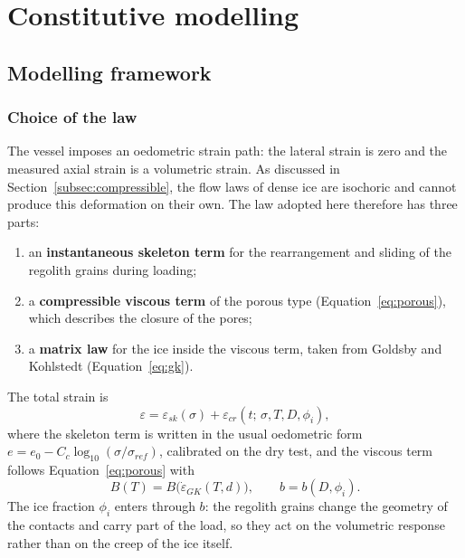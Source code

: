 \chapter{Constitutive modelling}
\label{ch:modelling}%

\section{Modelling framework}
\label{sec:framework}

\subsection{Choice of the law}

The vessel imposes an oedometric strain path: the lateral strain is zero and the measured axial strain is a volumetric strain. As discussed in Section~\ref{subsec:compressible}, the flow laws of dense ice are isochoric and cannot produce this deformation on their own. The law adopted here therefore has three parts:
\begin{enumerate}
    \item an \textbf{instantaneous skeleton term} for the rearrangement and sliding of the regolith grains during loading;
    \item a \textbf{compressible viscous term} of the porous type (Equation~\eqref{eq:porous}), which describes the closure of the pores;
    \item a \textbf{matrix law} for the ice inside the viscous term, taken from Goldsby and Kohlstedt (Equation~\eqref{eq:gk}).
\end{enumerate}
The total strain is
\begin{equation}
    \varepsilon = \varepsilon_{sk}(\sigma) + \varepsilon_{cr}(t;\,\sigma, T, D, \phi_i),
    \label{eq:decomposition}
\end{equation}
where the skeleton term is written in the usual oedometric form $e = e_0 - C_c\log_{10}(\sigma/\sigma_{ref})$, calibrated on the dry test, and the viscous term follows Equation~\eqref{eq:porous} with
\begin{equation}
    B(T) = B\bigl(\dot\varepsilon_{GK}(T, d)\bigr), \qquad b = b(D, \phi_i).
\end{equation}
The ice fraction $\phi_i$ enters through $b$: the regolith grains change the geometry of the contacts and carry part of the load, so they act on the volumetric response rather than on the creep of the ice itself.

